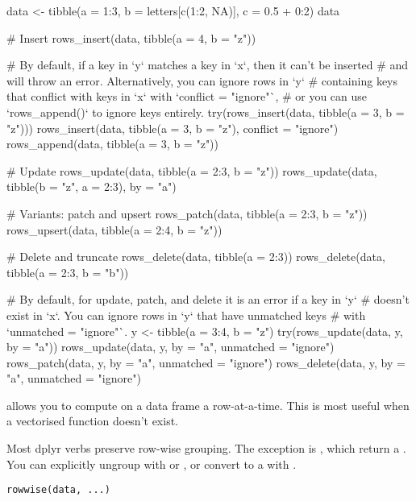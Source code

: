 \documentclass[a4paper]{book}
\begin{document}
%
\begin{Examples}
\begin{ExampleCode}
data <- tibble(a = 1:3, b = letters[c(1:2, NA)], c = 0.5 + 0:2)
data

# Insert
rows_insert(data, tibble(a = 4, b = "z"))

# By default, if a key in `y` matches a key in `x`, then it can't be inserted
# and will throw an error. Alternatively, you can ignore rows in `y`
# containing keys that conflict with keys in `x` with `conflict = "ignore"`,
# or you can use `rows_append()` to ignore keys entirely.
try(rows_insert(data, tibble(a = 3, b = "z")))
rows_insert(data, tibble(a = 3, b = "z"), conflict = "ignore")
rows_append(data, tibble(a = 3, b = "z"))

# Update
rows_update(data, tibble(a = 2:3, b = "z"))
rows_update(data, tibble(b = "z", a = 2:3), by = "a")

# Variants: patch and upsert
rows_patch(data, tibble(a = 2:3, b = "z"))
rows_upsert(data, tibble(a = 2:4, b = "z"))

# Delete and truncate
rows_delete(data, tibble(a = 2:3))
rows_delete(data, tibble(a = 2:3, b = "b"))

# By default, for update, patch, and delete it is an error if a key in `y`
# doesn't exist in `x`. You can ignore rows in `y` that have unmatched keys
# with `unmatched = "ignore"`.
y <- tibble(a = 3:4, b = "z")
try(rows_update(data, y, by = "a"))
rows_update(data, y, by = "a", unmatched = "ignore")
rows_patch(data, y, by = "a", unmatched = "ignore")
rows_delete(data, y, by = "a", unmatched = "ignore")
\end{ExampleCode}
\end{Examples}
%
\begin{Description}
 allows you to compute on a data frame a row-at-a-time.
This is most useful when a vectorised function doesn't exist.

Most dplyr verbs preserve row-wise grouping. The exception is ,
which return a . You can explicitly ungroup with 
or , or convert to a  with .
\end{Description}
%
\begin{Usage}
\begin{verbatim}
rowwise(data, ...)
\end{verbatim}
\end{Usage}
\end{document}
